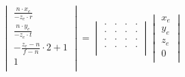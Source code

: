 \documentclass[a4paper,12pt]{article}
\begin{document}
\begin{center}
    \begin{math}
        \begin{aligned}
            \begin{vmatrix}
                \frac{n \cdot x_e}{-z_e\cdot r} \\
                \frac{n \cdot y_e}{-z_e\cdot t} \\
                -\frac{z_e-n}{f-n} \cdot 2 +1   \\
                1                               \\
            \end{vmatrix}
            =
            \begin{vmatrix}
                \cdot & \cdot & \cdot & \cdot \\
                \cdot & \cdot & \cdot & \cdot \\
                \cdot & \cdot & \cdot & \cdot \\
                \cdot & \cdot & \cdot & \cdot \\
            \end{vmatrix}
            \begin{vmatrix}
                x_e \\
                y_e \\
                z_e \\
                0   \\
            \end{vmatrix}
        \end{aligned}
    \end{math}
\end{center}
\par{}
\end{document}

